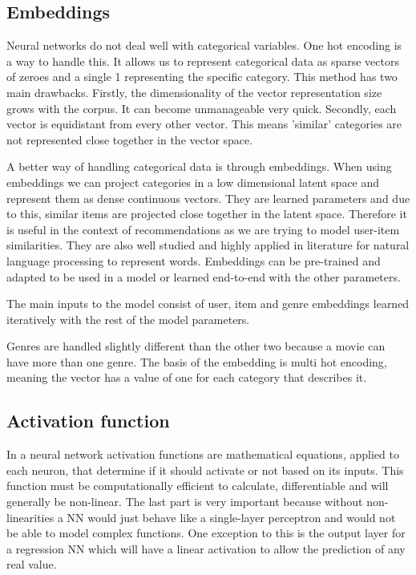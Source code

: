
\subsection{Embeddings}
Neural networks do not deal well with categorical variables. One hot encoding is a way to handle this. It allows us to represent categorical data as sparse vectors of zeroes and a single 1 representing the specific category. This method has two main drawbacks. Firstly, the dimensionality of the vector representation size grows with the corpus. It can become unmanageable very quick. Secondly, each vector is equidistant from every other vector. This means 'similar' categories are not represented close together in the vector space.

A better way of handling categorical data is through embeddings. When using embeddings we can project categories in a low dimensional latent space and represent them as dense continuous vectors. They are learned parameters and due to this, similar items are projected close together in the latent space. Therefore it is useful in the context of recommendations as we are trying to model user-item similarities. They are also well studied and highly applied in literature for natural language processing to represent words. Embeddings can be pre-trained and adapted to be used in a model or learned end-to-end with the other parameters.

The main inputs to the model consist of user, item and genre embeddings learned iteratively with the rest of the model parameters.

Genres are handled slightly different than the other two because a movie can have more than one genre. The basis of the embedding is multi hot encoding, meaning the vector has a value of one for each category that describes it.

\subsection{Activation function}
In a neural network activation functions are mathematical equations, applied to each neuron, that determine if it should activate or not based on its inputs. This function must be computationally efficient to calculate, differentiable and will generally be non-linear. The last part is very important because without non-linearities a NN would just behave like a single-layer perceptron and would not be able to model complex functions. One exception to this is the output layer for a regression NN which will have a linear activation to allow the prediction of any real value.

